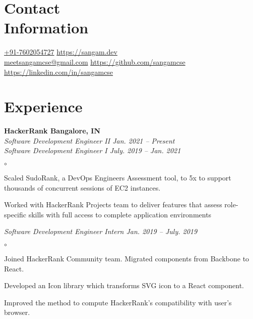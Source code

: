 \documentclass[margin,line]{resume}
\begin{document}
\begin{resume}
    \section{\mysidestyle Contact\\Information}
    \href{tel:+917602054727}{+91-7602054727}                                      \hfill    \url{https://sangam.dev}\\%
    \href{mailto:meetsangamcse@gmail.com}{meetsangamcse@gmail.com}      \hfill    \url{https://github.com/sangamcse}\\%
    \null                                                            \hfill    \url{https://linkedin.com/in/sangamcse}%

    \section{\mysidestyle Experience}

    \textbf{HackerRank                                                                     \hfill    Bangalore, IN} \\%
    \emph{Software Development Engineer II                                          \hfill    Jan. 2021 -- Present} \\%
    \emph{Software Development Engineer I                                           \hfill    July. 2019 -- Jan. 2021}%
    \begin{list}{$\circ$}{}
        \item Scaled SudoRank, a DevOps Engineers Assessment tool, to 5x to support thousands of concurrent sessions of
              EC2 instances.
        \item Worked with HackerRank Projects team to deliver features that assess role-specific skills with full     %
              access to complete application environments
    \end{list}
    \emph{Software Development Engineer Intern                                      \hfill    Jan. 2019 -- July. 2019}%
    \begin{list}{$\circ$}{}
        \item Joined HackerRank Community team. Migrated components from Backbone to React.
        \item Developed an Icon library which transforms SVG icon to a React component.
        \item Improved the method to compute HackerRank's compatibility with user's browser.
    \end{list}


\end{resume}
\end{document}
